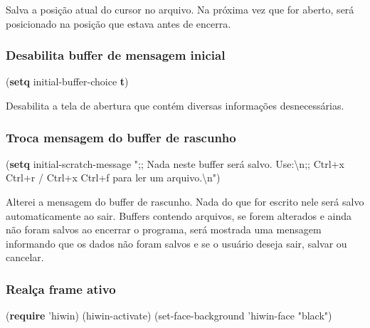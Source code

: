 \documentclass[]{article}
\newenvironment{Shaded}{}{}
\newcommand{\KeywordTok}[1]{\textcolor[rgb]{0.00,0.44,0.13}{\textbf{{#1}}}}
\newcommand{\StringTok}[1]{\textcolor[rgb]{0.25,0.44,0.63}{{#1}}}
\newcommand{\NormalTok}[1]{{#1}}
\begin{document}
Salva a posição atual do cursor no arquivo. Na próxima vez que for
aberto, será posicionado na posição que estava antes de encerra.

\subsubsection{Desabilita buffer de mensagem
inicial}\label{desabilita-buffer-de-mensagem-inicial}

\begin{Shaded}
\begin{Highlighting}[]
\NormalTok{(}\KeywordTok{setq} \NormalTok{initial-buffer-choice}
    \KeywordTok{t}\NormalTok{)}
\end{Highlighting}
\end{Shaded}

Desabilita a tela de abertura que contém diversas informações
desnecessárias.

\subsubsection{Troca mensagem do buffer de
rascunho}\label{troca-mensagem-do-buffer-de-rascunho}

\begin{Shaded}
\begin{Highlighting}[]
\NormalTok{(}\KeywordTok{setq} \NormalTok{initial-scratch-message}
    \StringTok{";; Nada neste buffer será salvo. Use:}\NormalTok{\textbackslash{}n}\StringTok{;;}
\StringTok{    Ctrl+x Ctrl+r / Ctrl+x Ctrl+f para ler um arquivo.}\NormalTok{\textbackslash{}n}\StringTok{"}\NormalTok{)}
\end{Highlighting}
\end{Shaded}

Alterei a mensagem do buffer de rascunho. Nada do que for escrito nele
será salvo automaticamente ao sair. Buffers contendo arquivos, se forem
alterados e ainda não foram salvos ao encerrar o programa, será mostrada
uma mensagem informando que os dados não foram salvos e se o usuário
deseja sair, salvar ou cancelar.

\subsubsection{Realça frame ativo}\label{realuxe7a-frame-ativo}

\begin{Shaded}
\begin{Highlighting}[]
\NormalTok{(}\KeywordTok{require} \NormalTok{'hiwin)}
\NormalTok{(hiwin-activate)}
\NormalTok{(set-face-background 'hiwin-face }\StringTok{"black"}\NormalTok{)}
\end{Highlighting}
\end{Shaded}
\end{document}
